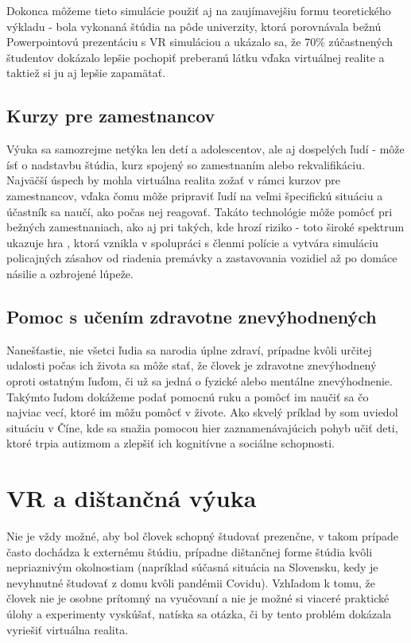 \documentclass[10pt,twoside,slovak,a4paper]{article}
\begin{document}
Dokonca môžeme tieto simulácie použiť aj na zaujímavejšiu formu teoretického výkladu - bola vykonaná štúdia na pôde univerzity, \cite{studium} ktorá porovnávala bežnú Powerpointovú prezentáciu s VR simuláciou a ukázalo sa, že 70\%  zúčastnených študentov dokázalo lepšie pochopiť preberanú látku vďaka virtuálnej realite a taktiež si ju aj lepšie zapamätať.

\subsection{Kurzy pre zamestnancov} \label{zamestnanci}
Výuka sa samozrejme netýka len detí a adolescentov, ale aj dospelých ľudí - môže ísť o nadstavbu štúdia, kurz spojený so zamestnaním alebo rekvalifikáciu. Najväčší úspech by mohla virtuálna realita zožať v rámci kurzov pre zamestnancov, vďaka čomu môže pripraviť ľudí na veľmi špecifickú situáciu a účastník sa naučí, ako počas nej reagovať. Takáto technológie môže pomôcť pri bežných zamestnaniach, ako aj pri takých, kde hrozí riziko - toto široké spektrum ukazuje hra \cite{policia}, ktorá vznikla v spolupráci s členmi polície a vytvára simuláciu policajných zásahov od riadenia premávky a zastavovania vozidiel až po domáce násilie a ozbrojené lúpeže.

\subsection{Pomoc s učením zdravotne znevýhodnených} \label{pomoc}
Nanešťastie, nie všetci ľudia sa narodia úplne zdraví, prípadne kvôli určitej udalosti počas ich života sa môže stať, že človek je zdravotne znevýhodnený oproti ostatným ľuďom, či už sa jedná o fyzické alebo mentálne znevýhodnenie. Takýmto ľudom dokážeme podať pomocnú ruku a pomôcť im naučiť sa čo najviac vecí, ktoré im môžu pomôcť v živote. Ako skvelý príklad by som uviedol situáciu v Číne,\cite{hry} kde sa snažia pomocou hier zaznamenávajúcich pohyb učiť deti, ktoré trpia autizmom a zlepšiť ich kognitívne a sociálne schopnosti.

\section{VR a dištančná výuka} \label{stvrta}

Nie je vždy možné, aby bol človek schopný študovať prezenčne, v takom prípade často dochádza k externému štúdiu, prípadne dištančnej forme štúdia kvôli nepriaznivým okolnostiam (napríklad súčasná situácia na Slovensku, kedy je nevyhnutné študovať z domu kvôli pandémii Covidu). Vzhľadom k tomu, že človek nie je osobne prítomný na vyučovaní a nie je možné si viaceré praktické úlohy a experimenty vyskúšať, natíska sa otázka, či by tento problém dokázala vyriešiť virtuálna realita.
\end{document}
